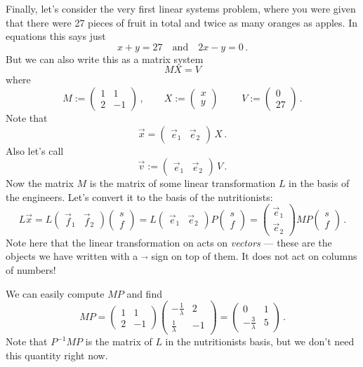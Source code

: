 {Finally, let's consider the very first linear systems problem, where you were given that there were 27 pieces of fruit in total and twice as many oranges as apples. In equations this says just
\[
x+y=27\quad \mbox{and} \quad 2x-y=0\, .
\]
But we can also write this as a matrix system
\[
MX=V
\]
where 
\[
M:=\begin{pmatrix} 1 & 1 \\ 2 & -1 \end{pmatrix}\, ,\qquad
X:=\begin{pmatrix}x \\y \end{pmatrix}\, \,\qquad
V:=\begin{pmatrix}0 \\ 27\end{pmatrix}\, .
\]
Note that 
\[
\vec x = \begin{pmatrix}\vec e_1 & \vec e_2\end{pmatrix}\, X\, .
\]
Also let's call \[ \vec v:= \begin{pmatrix}\vec e_1 & \vec e_2\end{pmatrix}\, V\, .\]
Now the matrix $M$ is the matrix of some linear transformation $L$ in the basis of the engineers.
Let's convert it to the basis of the nutritionists:
\[
L\vec x = L \begin{pmatrix}\vec f_1 & \vec f_2\end{pmatrix}
\begin{pmatrix} s \\  f\end{pmatrix}
= L \begin{pmatrix}\vec e_1 & \vec e_2\end{pmatrix} P \begin{pmatrix} s \\  f\end{pmatrix}
= \begin{pmatrix} \vec e_1 \\ \vec e_2\end{pmatrix} M P \begin{pmatrix} s \\  f\end{pmatrix}\, .
\]
Note here that the linear transformation on acts on {\itshape vectors} --- these are the objects we have written with a $\vec{}$ sign on top of them. It does not act on columns of numbers!

We can easily compute $MP$ and find
\[
MP=\begin{pmatrix} 1 & 1 \\ 2 & -1 \end{pmatrix}\begin{pmatrix}-\frac1\lambda & 2\\ \frac1\lambda & -1
\end{pmatrix}
=\begin{pmatrix}0& 1\\ -\frac3\lambda & 5
\end{pmatrix}\, .
\] 
Note that $P^{-1}MP$ is the matrix of $L$ in the nutritionists basis, but we don't need this quantity right now.

}
